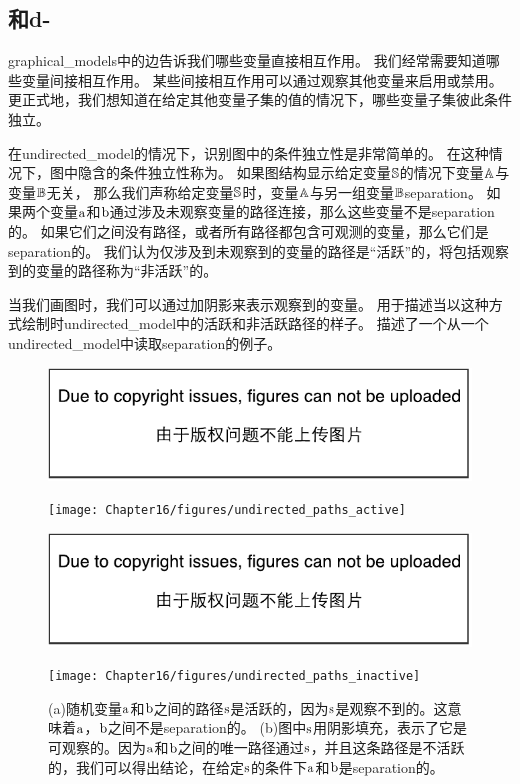 \subsection{和d-}
\label{sec:separation_and_d_separation}

\gls{graphical_models}中的边告诉我们哪些变量直接相互作用。
我们经常需要知道哪些变量间接相互作用。 
某些间接相互作用可以通过观察其他变量来启用或禁用。
更正式地，我们想知道在给定其他变量子集的值的情况下，哪些变量子集彼此条件独立。


在\gls{undirected_model}的情况下，识别图中的条件独立性是非常简单的。 
在这种情况下，图中隐含的条件独立性称为。
如果图结构显示给定变量$\mathbb{S}$的情况下变量$\mathbb{A}$与变量$\mathbb{B}$无关，
那么我们声称给定变量$\mathbb{S}$时，变量$\mathbb{A}$与另一组变量$\mathbb{B}$\gls{separation}。
如果两个变量$\mathrm{a}$和$\mathrm{b}$通过涉及未观察变量的路径连接，那么这些变量不是\gls{separation}的。
如果它们之间没有路径，或者所有路径都包含可观测的变量，那么它们是\gls{separation}的。
我们认为仅涉及到未观察到的变量的路径是``活跃''的，将包括观察到的变量的路径称为``非活跃''的。


当我们画图时，我们可以通过加阴影来表示观察到的变量。
用于描述当以这种方式绘制时\gls{undirected_model}中的活跃和非活跃路径的样子。
描述了一个从一个\gls{undirected_model}中读取\gls{separation}的例子。


\begin{figure}[!htb]
\ifOpenSource
\centerline{\includegraphics{figure.pdf}}
\else
	\centerline{\texttt{[image: Chapter16/figures/undirected\_paths\_active]}}
\fi
\ifOpenSource
\centerline{\includegraphics{figure.pdf}}
\else
	\centerline{\texttt{[image: Chapter16/figures/undirected\_paths\_inactive]}}	
\fi
	\caption{(a)随机变量$\mathrm{a}$和$\mathrm{b}$之间的路径$\mathrm{s}$是活跃的，因为$\mathrm{s}$是观察不到的。这意味着$\mathrm{a}$，$\mathrm{b}$之间不是\gls{separation}的。 (b)图中$\mathrm{s}$用阴影填充，表示了它是可观察的。因为$\mathrm{a}$和$\mathrm{b}$之间的唯一路径通过$\mathrm{s}$，并且这条路径是不活跃的，我们可以得出结论，在给定$\mathrm{s}$的条件下$\mathrm{a}$和$\mathrm{b}$是\gls{separation}的。}
	\label{fig:undirected_paths_active}
\end{figure}


